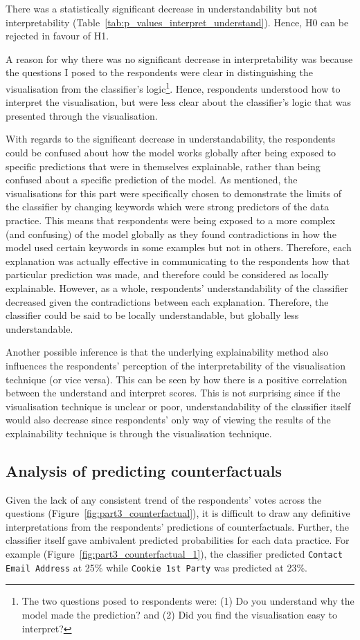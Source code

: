 There was a statistically significant decrease in understandability but not interpretability (Table~\ref{tab:p_values_interpret_understand}). Hence, H0 can be rejected in favour of H1. 

A reason for why there was no significant decrease in interpretability was because the questions I posed to the respondents were clear in distinguishing the visualisation from the classifier's logic\footnote{The two questions posed to respondents were: (1) Do you understand why the model made the prediction? and (2) Did you find the visualisation easy to interpret?}. Hence, respondents understood how to interpret the visualisation, but were less clear about the classifier's logic that was presented through the visualisation. 

With regards to the significant decrease in understandability, the respondents could be confused about how the model works globally after being exposed to specific predictions that were in themselves explainable, rather than being confused about a specific prediction of the model. As mentioned, the visualisations for this part were specifically chosen to demonstrate the limits of the classifier by changing keywords which were strong predictors of the data practice. This means that respondents were being exposed to a more complex (and confusing) of the model globally as they found contradictions in how the model used certain keywords in some examples but not in others. Therefore, each explanation was actually effective in communicating to the respondents how that particular prediction was made, and therefore could be considered as locally explainable. However, as a whole, respondents' understandability of the classifier decreased given the contradictions between each explanation. Therefore, the classifier could be said to be locally understandable, but globally less understandable.

Another possible inference is that the underlying explainability method also influences the respondents' perception of the interpretability of the visualisation technique (or vice versa). This can be seen by how there is a positive correlation between the understand and interpret scores. This is not surprising since if the visualisation technique is unclear or poor, understandability of the classifier itself would also decrease since respondents' only way of viewing the results of the explainability technique is through the visualisation technique.

\subsection{Analysis of predicting counterfactuals}
Given the lack of any consistent trend of the respondents' votes across the questions (Figure~\ref{fig:part3_counterfactual}), it is difficult to draw any definitive interpretations from the respondents' predictions of counterfactuals. Further, the classifier itself gave ambivalent predicted probabilities for each data practice. For example (Figure~\ref{fig:part3_counterfactual_1}), the classifier predicted \texttt{Contact Email Address} at 25\% while \texttt{Cookie 1st Party} was predicted at 23\%.

